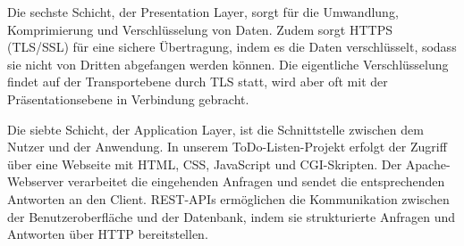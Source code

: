 Die sechste Schicht, der Presentation Layer, sorgt für die Umwandlung, Komprimierung und Verschlüsselung von Daten. Zudem sorgt HTTPS (TLS/SSL) für eine sichere Übertragung, indem es die Daten verschlüsselt, sodass sie nicht von Dritten abgefangen werden können. Die eigentliche Verschlüsselung findet auf der Transportebene durch TLS statt, wird aber oft mit der Präsentationsebene in Verbindung gebracht.

Die siebte Schicht, der Application Layer, ist die Schnittstelle zwischen dem Nutzer und der Anwendung. In unserem ToDo-Listen-Projekt erfolgt der Zugriff über eine Webseite mit HTML, CSS, JavaScript und CGI-Skripten. Der Apache-Webserver verarbeitet die eingehenden Anfragen und sendet die entsprechenden Antworten an den Client. REST-APIs ermöglichen die Kommunikation zwischen der Benutzeroberfläche und der Datenbank, indem sie strukturierte Anfragen und Antworten über HTTP bereitstellen.
